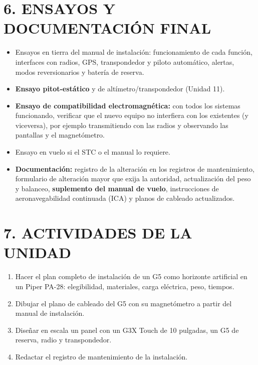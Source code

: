 \section*{6. ENSAYOS Y DOCUMENTACIÓN FINAL}
\begin{itemize}
  \item Ensayos en tierra del manual de instalación: funcionamiento de cada función, interfaces
        con radios, GPS, transpondedor y piloto automático, alertas, modos reversionarios y
        batería de reserva.
  \item \textbf{Ensayo pitot-estático} y de altímetro/transpondedor (Unidad 11).
  \item \textbf{Ensayo de compatibilidad electromagnética:} con todos los sistemas funcionando,
        verificar que el nuevo equipo no interfiera con los existentes (y viceversa), por ejemplo
        transmitiendo con las radios y observando las pantallas y el magnetómetro.
  \item Ensayo en vuelo si el STC o el manual lo requiere.
  \item \textbf{Documentación:} registro de la alteración en los registros de mantenimiento,
        formulario de alteración mayor que exija la autoridad, actualización del peso y balanceo,
        \textbf{suplemento del manual de vuelo}, instrucciones de aeronavegabilidad continuada
        (ICA) y planos de cableado actualizados.
\end{itemize}

\section*{7. ACTIVIDADES DE LA UNIDAD}
\begin{enumerate}
  \item Hacer el plan completo de instalación de un G5 como horizonte artificial en un Piper PA-28:
        elegibilidad, materiales, carga eléctrica, peso, tiempos.
  \item Dibujar el plano de cableado del G5 con su magnetómetro a partir del manual de instalación.
  \item Diseñar en escala un panel con un G3X Touch de 10 pulgadas, un G5 de reserva, radio y
        transpondedor.
  \item Redactar el registro de mantenimiento de la instalación.
\end{enumerate}
